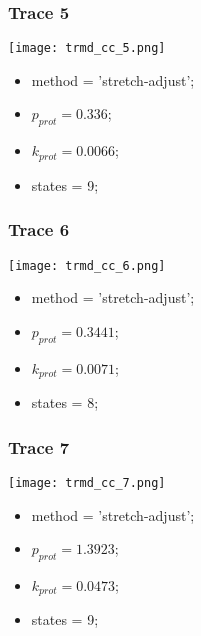\subsubsection{Trace 5}
\begin{minipage}[c]{0.7\textwidth}
	\texttt{[image: trmd\_cc\_5.png]}
\end{minipage}
\hfill
\begin{minipage}[c]{0.45\textwidth}
	\begin{itemize}
		\item method = 'stretch-adjust';
		\item $p_{prot}=0.336$;
		\item $k_{prot}=0.0066$;
		\item states = 9;
	\end{itemize}
\end{minipage}

\subsubsection{Trace 6}
\begin{minipage}[c]{0.7\textwidth}
	\texttt{[image: trmd\_cc\_6.png]}
\end{minipage}
\hfill
\begin{minipage}[c]{0.45\textwidth}
	\begin{itemize}
		\item method = 'stretch-adjust';
		\item $p_{prot}=0.3441$;
		\item $k_{prot}=0.0071$;
		\item states = 8;
	\end{itemize}
\end{minipage}

\subsubsection{Trace 7}
\begin{minipage}[c]{0.7\textwidth}
	\texttt{[image: trmd\_cc\_7.png]}
\end{minipage}
\hfill
\begin{minipage}[c]{0.45\textwidth}
	\begin{itemize}
		\item method = 'stretch-adjust';
		\item $p_{prot}=1.3923$;
		\item $k_{prot}=0.0473$;
		\item states = 9;
	\end{itemize}
\end{minipage}

